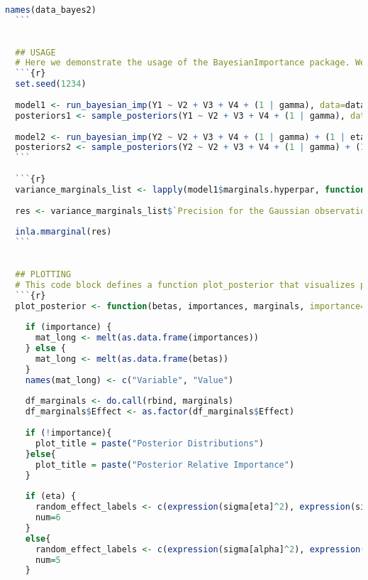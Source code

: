 \begin{lstlisting}[language=R, caption=Usage of the Bayesian Importance package with plots and examples.]
  names(data_bayes2)
  ```
  
  
  ## USAGE
  # Here we demonstrate the usage of the BayesianImportance package. We fit two Bayesian models and sample posterior distributions for different simulated datasets using functions from the package BayesiannImportance. We fit one model with a single random intercept and one model with two random intercepts
  ```{r}
  set.seed(1234)
  
  model1 <- run_bayesian_imp(Y1 ~ V2 + V3 + V4 + (1 | gamma), data=data_bayes1)
  posteriors1 <- sample_posteriors(Y1 ~ V2 + V3 + V4 + (1 | gamma), data=data_bayes1, 5000, n)
  
  model2 <- run_bayesian_imp(Y2 ~ V2 + V3 + V4 + (1 | gamma) + (1 | eta), data=data_bayes2)
  posteriors2 <- sample_posteriors(Y2 ~ V2 + V3 + V4 + (1 | gamma) + (1 | eta), data=data_bayes2, 5000, n)
  ```
  
  ```{r}
  variance_marginals_list <- lapply(model1$marginals.hyperpar, function(x) inla.tmarginal(function(t) 1/t, x))
  
  res <- variance_marginals_list$`Precision for the Gaussian observations`
  
  inla.mmarginal(res)
  ```
  
  
  ## PLOTTING
  # This code block defines a function plot_posterior that visualizes posterior distributions and relative importance from the sampled posteriors. The function creates density plots and overlays line plots for variance marginals. This can be modified for the specific problem at hand, and is not included in the package since it is a problem specific function.
  ```{r}
  plot_posterior <- function(betas, importances, marginals, importance=FALSE, theoretical=FALSE, eta=FALSE) {
    
    if (importance) {
      mat_long <- melt(as.data.frame(importances))
    } else {
      mat_long <- melt(as.data.frame(betas))
    }
    names(mat_long) <- c("Variable", "Value")
    
    df_marginals <- do.call(rbind, marginals)
    df_marginals$Effect <- as.factor(df_marginals$Effect)
    
    if (!importance){
      plot_title = paste("Posterior Distributions")
    }else{
      plot_title = paste("Posterior Relative Importance")
    }
    
    if (eta) {
      random_effect_labels <- c(expression(sigma[eta]^2), expression(sigma[alpha]^2), expression(sigma[epsilon]^2))
      num=6
    }
    else{
      random_effect_labels <- c(expression(sigma[alpha]^2), expression(sigma[epsilon]^2))
      num=5
    }
    

\end{lstlisting}
